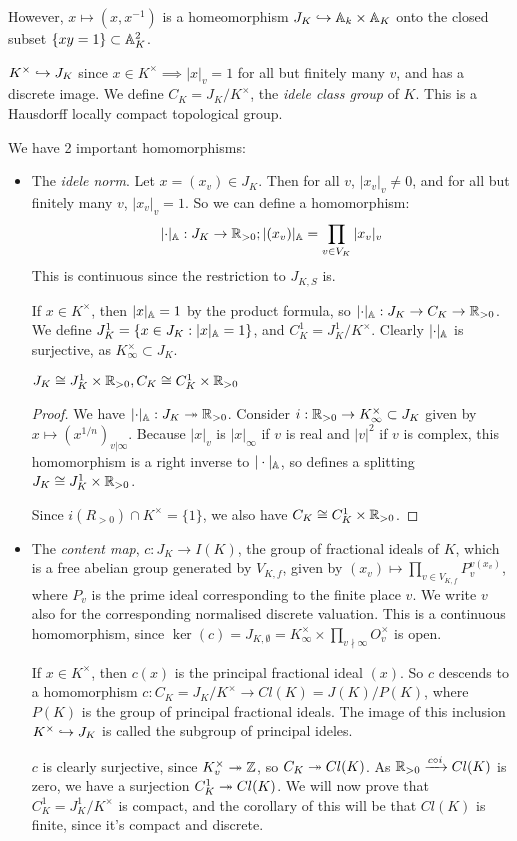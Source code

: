 \documentclass[10pt,a4paper]{article}
\begin{document}
However, $x\mapsto (x, x^{-1})$ is a homeomorphism $J_K \hookrightarrow \mathbb{A}_k \times \mathbb{A}_K$ onto the closed subset $\{xy = 1\}\subset \mathbb{A}_K^2$.

$K^\times \hookrightarrow J_K$ since $x \in K^\times \implies |x|_v = 1$ for all but finitely many $v$, and has a discrete image. We define $C_K = J_K/K^\times$, the \emph{idele class group} of $K$. This is a Hausdorff locally compact topological group.

We have 2 important homomorphisms:
\begin{itemize}
  \item The \emph{idele norm}. Let $x = (x_v) \in J_K$. Then for all $v$, $|x_v|_v \neq 0$, and for all but finitely many $v$, $|x_v|_v = 1$. So we can define a homomorphism:
  \[\lvert\cdot\rvert_{\mathbb{A}} : J_K \to \mathbb{R}_{>0}; |(x_v)|_{\mathbb{A}} = \prod_{v\in V_K}|x_v|_v\]
  This is continuous since the restriction to $J_{K,S}$ is.

  If $x \in K^\times$, then $|x|_{\mathbb{A}} = 1$ by the product formula, so $\lvert\cdot\rvert_{\mathbb{A}}:J_K \to C_K \to \mathbb{R}_{>0}$. We define $J_K^{1} = \{x \in J_K : |x|_{\mathbb{A}} = 1\}$, and $C_K^1 = J_K^1/K^\times$. Clearly $\lvert\cdot\rvert_{\mathbb{A}}$ is surjective, as $K_\infty^\times \subset J_K$.

  \begin{proposition}
    $J_K \cong J_K^1 \times \mathbb{R}_{>0}, C_K \cong C_K^1 \times \mathbb{R}_{>0}$
  \end{proposition}
  \begin{proof}
    We have $\lvert\cdot\rvert_{\mathbb{A}}:J_K \twoheadrightarrow \mathbb{R}_{>0}$. Consider $i:\mathbb{R}_{>0} \to K_\infty^\times \subset J_K$ given by $x \mapsto (x^{1/n})_{v|\infty}$. Because $|x|_v$ is $|x|_\infty$ if $v$ is real and $|v|^2$ if $v$ is complex, this homomorphism is a right inverse to $|\cdot|_{\mathbb{A}}$, so defines a splitting $J_K \cong J_K^1 \times \mathbb{R}_{>0}$.

    Since $i(R_{>0}) \cap K^\times =\{1\}$, we also have $C_K \cong C_K^1 \times \mathbb{R}_{>0}$.
  \end{proof}

  \item The \emph{content map}, $c : J_K \to I(K)$, the group of fractional ideals of $K$, which is a free abelian group generated by $V_{K,f}$, given by $(x_v) \mapsto \prod_{v \in V_{K,f}} P_v^{v(x_v)}$, where $P_v$ is the prime ideal corresponding to the finite place $v$. We write $v$ also for the corresponding normalised discrete valuation. This is a continuous homomorphism, since $\ker(c) =J_{K,\emptyset} = K_\infty^\times \times \prod_{v\nmid \infty}O_v^\times$ is open.

  If $x \in K^\times$, then $c(x)$ is the principal fractional ideal $(x)$. So $c$ descends to a homomorphism $c: C_K = J_K/K^\times \to Cl(K) = J(K)/P(K)$, where $P(K)$ is the group of principal fractional ideals. The image of this inclusion $K^\times \hookrightarrow J_K$ is called the subgroup of principal ideles.

  $c$ is clearly surjective, since $K_v^\times \twoheadrightarrow \mathbb{Z}$, so $C_K \twoheadrightarrow Cl(K)$. As $\mathbb{R}_{>0} \xrightarrow{c\circ i} Cl(K)$ is zero, we have a surjection $C_K^1 \twoheadrightarrow Cl(K)$. We will now prove that $C_K^1 = J_K^1/K^\times$ is compact, and the corollary of this will be that $Cl(K)$ is finite, since it's compact and discrete.
\end{itemize}
\end{document}
